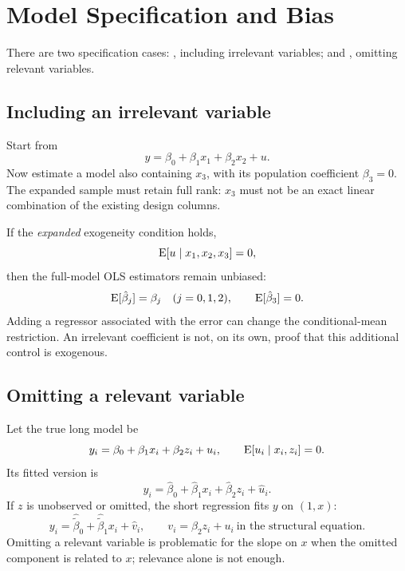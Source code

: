 \section{Model Specification and Bias}
\label{sec:model-specification}
There are two specification cases: , including irrelevant variables; and , omitting relevant variables.

\subsection{Including an irrelevant variable}
Start from
\[y=\beta_0+\beta_1x_1+\beta_2x_2+u.\]
Now estimate a model also containing $x_3$, with its population coefficient $\beta_3=0$. The expanded sample must retain full rank: $x_3$ must not be an exact linear combination of the existing design columns.

If the \emph{expanded} exogeneity condition holds,
\[\operatorname{E}[u\mid x_1,x_2,x_3]=0,
\]
then the full-model OLS estimators remain unbiased:
\[\operatorname{E}[\hat\beta_j]=\beta_j\quad(j=0,1,2),\qquad
\operatorname{E}[\hat\beta_3]=0.
\]
 Adding a regressor associated with the error can change the conditional-mean restriction. An irrelevant coefficient is not, on its own, proof that this additional control is exogenous.


\subsection{Omitting a relevant variable}
\label{sec:ovb-sample}
Let the true long model be
\[y_i=\beta_0+\beta_1x_i+\beta_2z_i+u_i,\qquad
\operatorname{E}[u_i\mid x_i,z_i]=0.\]
Its fitted version is
\[y_i=\hat\beta_0+\hat\beta_1x_i+\hat\beta_2z_i+\hat u_i.
\]
If $z$ is unobserved or omitted, the short regression fits $y$ on $(1,x)$:
\[y_i=\hat{\tilde\beta}_0+\hat{\tilde\beta}_1x_i+\hat v_i,
\qquad v_i=\beta_2z_i+u_i\ \text{in the structural equation}.
\]
Omitting a relevant variable is problematic for the slope on $x$ when the omitted component is related to $x$; relevance alone is not enough.

